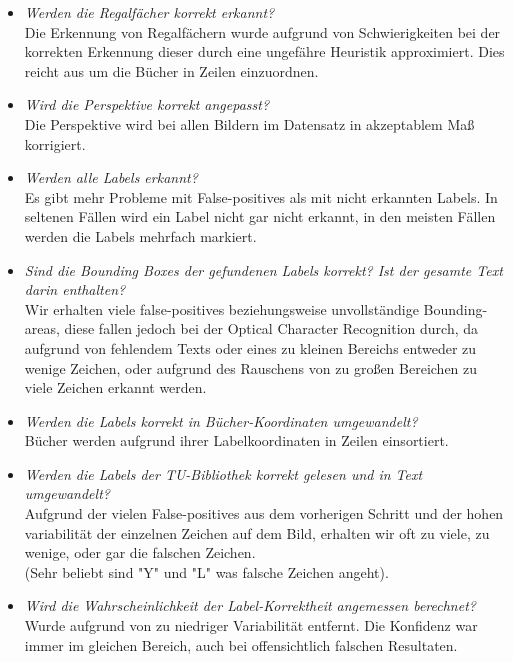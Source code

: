 \documentclass[paper=A4, deutsch]{scrartcl}
\begin{document}
\begin{itemize}
	\item \textit{Werden die Regalfächer korrekt erkannt?}\\
		  Die Erkennung von Regalfächern wurde aufgrund von Schwierigkeiten bei der korrekten Erkennung dieser durch eine ungefähre Heuristik approximiert. Dies reicht aus um die Bücher in Zeilen einzuordnen.
		  
	\item \textit{Wird die Perspektive korrekt angepasst?}\\
		  Die Perspektive wird bei allen Bildern im Datensatz in akzeptablem Maß korrigiert.
		  
	\item \textit{Werden alle Labels erkannt?}\\
		  Es gibt mehr Probleme mit False-positives als mit nicht erkannten Labels. In seltenen Fällen wird ein Label nicht gar nicht erkannt, in den meisten Fällen werden die Labels mehrfach markiert.
		  
	\item \textit{Sind die Bounding Boxes der gefundenen Labels korrekt? Ist der gesamte Text darin enthalten?}\\
		  Wir erhalten viele false-positives beziehungsweise unvollständige Bounding-areas, diese fallen jedoch bei der Optical Character Recognition durch, da aufgrund von fehlendem Texts oder eines zu kleinen Bereichs entweder zu wenige Zeichen, oder aufgrund des Rauschens von zu großen Bereichen zu viele Zeichen erkannt werden.
		  
	\item \textit{Werden die Labels korrekt in Bücher-Koordinaten umgewandelt?}\\
		  Bücher werden aufgrund ihrer Labelkoordinaten in Zeilen einsortiert.
		  
	\item \textit{Werden die Labels der TU-Bibliothek korrekt gelesen und in Text umgewandelt?}\\
		  Aufgrund der vielen False-positives aus dem vorherigen Schritt und der hohen variabilität der einzelnen Zeichen auf dem Bild, erhalten wir oft zu viele, zu wenige, oder gar die falschen Zeichen.\\(Sehr beliebt sind "Y" und "L" was falsche Zeichen angeht).
		  
	\item \textit{Wird die Wahrscheinlichkeit der Label-Korrektheit angemessen berechnet?}\\
		  Wurde aufgrund von zu niedriger Variabilität entfernt. Die Konfidenz war immer im gleichen Bereich, auch bei offensichtlich falschen Resultaten.
		  
\end{itemize}
\end{document}

